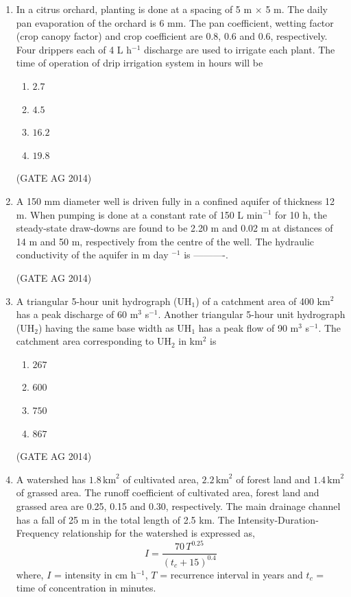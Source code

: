 \documentclass[journal,12pt,onecolumn]{IEEEtran}
\begin{document}
\begin{enumerate}
    \item In a citrus orchard, planting is done at a spacing of 5 m $\times$ 5 m. The daily pan evaporation of the orchard is 6 mm. The pan coefficient, wetting factor (crop canopy factor) and crop coefficient are 0.8, 0.6 and 0.6, respectively. Four drippers each of 4 L h$^{-1}$ discharge are used to irrigate each plant. The time of operation of drip irrigation system in hours will be
   \begin{multicols}{4} 
    \begin{enumerate}
        \item $2.7$
        \item $4.5$
        \item $16.2$
        \item $19.8$
    \end{enumerate}
     \end{multicols}
    \hfill(GATE AG 2014)

    \item A 150 mm diameter well is driven fully in a confined aquifer of thickness 12 m. When pumping is done at a constant rate of 150 L min$^{-1}$ for 10 h, the steady-state draw-downs are found to be 2.20 m and 0.02 m at distances of 14 m and 50 m, respectively from the centre of the well. The hydraulic conductivity of the aquifer in m day $^{-1}$ is ----------.

    \hfill(GATE AG 2014)

    \item A triangular 5-hour unit hydrograph (UH$_1$) of a catchment area of 400 km$^2$ has a peak discharge of 60 m$^3$ s$^{-1}$. Another triangular 5-hour unit hydrograph (UH$_2$) having the same base width as UH$_1$ has a peak flow of 90 m$^3$ s$^{-1}$. The catchment area corresponding to UH$_2$ in km$^2$ is
    \begin{multicols}{4}
     \begin{enumerate}
        \item $267$
        \item $600$
        \item $750$
        \item $867$
    \end{enumerate}
    \end{multicols}
    \hfill(GATE AG 2014)


\item A watershed has $1.8 \, \text{km}^2$ of cultivated area, 
$2.2 \, \text{km}^2$ of forest land and $1.4 \, \text{km}^2$ of grassed area. 
The runoff coefficient of cultivated area, forest land and grassed area are 
0.25, 0.15 and 0.30, respectively. 
The main drainage channel has a fall of 25 m in the total length of 2.5 km. 
The Intensity-Duration-Frequency relationship for the watershed is expressed as,
\[
I = \frac{70 \, T^{0.25}}{(t_c + 15)^{0.4}}
\]
where, $I$ = intensity in cm h$^{-1}$, $T$ = recurrence interval in years 
and $t_c$ = time of concentration in minutes.  


\end{enumerate}
\end{document}
